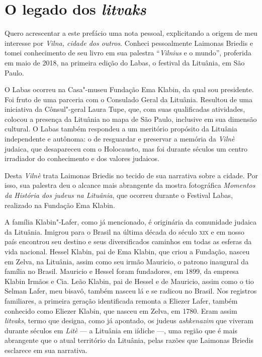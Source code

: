 \section*{O legado dos \textit{litvaks}}

Quero acrescentar a este prefácio uma nota pessoal, explicitando a
origem de meu interesse por \textit{Vilna, cidade dos outros}. Conheci
pessoalmente Laimonas Briedis e tomei conhecimento de seu livro em sua
palestra ``\textit{Vilnius} e o mundo'', proferida em maio de 2018, na primeira
edição do Labas, o festival da Lituânia, em São Paulo.

O Labas ocorreu na Casa"-museu Fundação Ema Klabin, da qual sou
presidente. Foi fruto de uma parceria com o Consulado Geral da Lituânia.
Resultou de uma iniciativa da Cônsul"-geral Laura Tupe, que, com suas
qualificadas atividades, colocou a presença da Lituânia no mapa de São
Paulo, inclusive em sua dimensão cultural. O Labas também respondeu a um
meritório propósito da Lituânia independente e autônoma: o de resguardar
e preservar a memória da \textit{Vilnè} judaica, que desapareceu com o
Holocausto, mas foi durante séculos um centro irradiador do conhecimento
e dos valores judaicos.

Desta \textit{Vilnè} trata Laimonas Briedis no tecido de sua narrativa sobre a
cidade. Por isso, sua palestra deu o alcance mais abrangente da mostra
fotográfica \textit{Momentos da História dos judeus na Lituânia}, que
ocorreu durante o Festival Labas, realizado na Fundação Ema Klabin.

A família Klabin"-Lafer, como já mencionado, é originária da comunidade
judaica da Lituânia. Imigrou para o Brasil na última década do século
\textsc{xix} e em nosso país encontrou seu destino e seus diversificados caminhos
em todas as esferas da vida nacional. Hessel Klabin, pai de Ema Klabin,
que criou a Fundação, nasceu em Zelva, na Lituânia, assim como seu irmão
Mauricio, o patrono inaugural da família no Brasil. Mauricio e Hessel
foram fundadores, em 1899, da empresa Klabin Irmãos e Cia. Leão Klabin,
pai de Hessel e de Mauricio, assim como o tio Selman Lafer, meu bisavô,
também nasceu lá e se radicou no Brasil. Nos registros familiares, a
primeira geração identificada remonta a Eliezer Lafer, também conhecido
como Eliezer Klabin, que nasceu em Zelva, em 1780. Eram assim
\textit{litvaks}, termo que designa, como já apontado, os judeus
\textit{ashkenazim} que viveram durante séculos em \textit{Litè} --- a Lituânia em
iídiche ---, uma região que é mais abrangente que o atual território da
Lituânia, pelas razões que Laimonas Briedis esclarece em sua narrativa.

